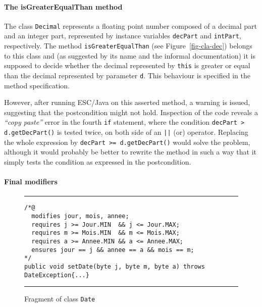 \documentclass[a4paper]{llncs}
\begin{document}
\paragraph{The isGreaterEqualThan method}


The class \texttt{Decimal} 
represents a floating point number 
composed of a decimal part and an integer part,
represented by instance variables \texttt{decPart}
and \texttt{intPart}, respectively. The
method \texttt{isGreaterEqualThan} (see Figure~\ref{fig-cla-dec})
belongs to this class and (as suggested by its name and the informal
documentation) it is supposed to decide whether the
decimal represented by \texttt{this} is greater or equal than the
decimal represented by parameter
\texttt{d}. This behaviour is specified in the method specification.

However, after running ESC/Java on this asserted method, a warning is
issued, suggesting that the postcondition
might not hold. Inspection of the code reveals a
\emph{``copy paste''} error in the fourth \texttt{if} statement, where 
the condition \texttt{decPart > d.getDecPart()}
is tested twice, on both side of an \texttt{||}
(or) operator. Replacing the whole expression
by \texttt{decPart >= d.getDecPart()} would solve the problem,
although it would probably be better to rewrite the method in such a
way that it simply tests the condition as expressed in the
postcondition.







\paragraph{Final modifiers}

\begin{figure}[t]
\rule{\linewidth}{0.3mm}
\begin{verbatim}
/*@
  modifies jour, mois, annee;
  requires j >= Jour.MIN  && j <= Jour.MAX;
  requires m >= Mois.MIN  && m <= Mois.MAX;
  requires a >= Annee.MIN && a <= Annee.MAX;
  ensures jour == j && annee == a && mois == m;
*/
public void setDate(byte j, byte m, byte a) throws DateException{...} 
\end{verbatim}
\caption{Fragment of class {\tt Date}}
\label{fig-cla-dat}
\rule{\linewidth}{0.3mm}
\end{figure}
\end{document}
